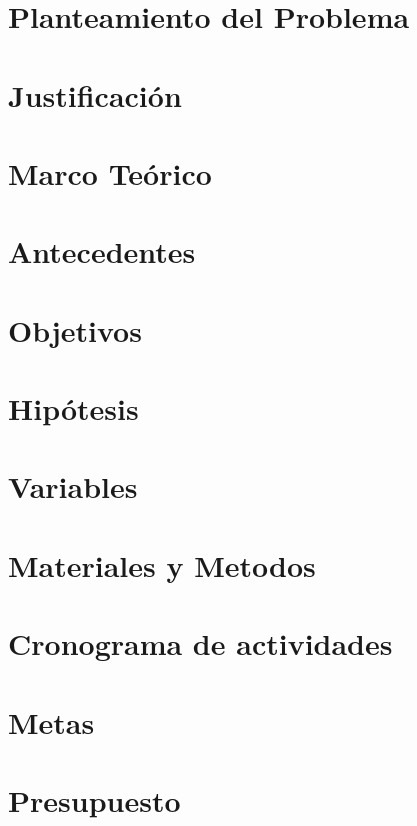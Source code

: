 \documentclass[12pt]{report}
\begin{document}
  


  \tableofcontents


  \chapter{Planteamiento del Problema}
  

  \chapter{Justificación}
  

  \chapter{Marco Teórico}
  

  \chapter{Antecedentes}
  

  \chapter{Objetivos}
  

  \chapter{Hipótesis}
  

  \chapter{Variables}
  
  
  \chapter{Materiales y Metodos}
  

  \chapter{Cronograma de actividades}
  

  \chapter{Metas}
  

  \chapter{Presupuesto}
  

  \printbibliography
\end{document}
